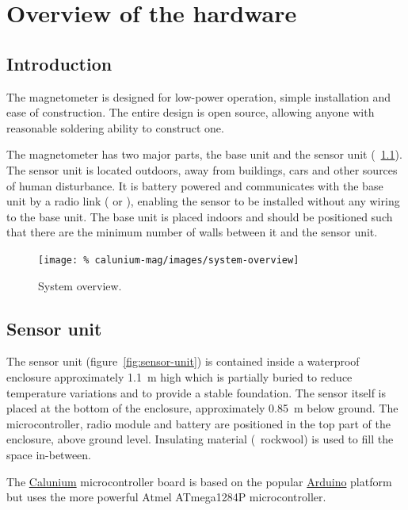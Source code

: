 \chapter{Overview of the hardware}

\section{Introduction}
The magnetometer is designed for low-power operation, simple
installation and ease of construction. The entire design is open
source, allowing anyone with reasonable soldering ability to construct
one.

The magnetometer has two major parts, the base unit and the sensor
unit (\figurename~\ref{fig:system-overview}). The sensor unit is located
outdoors, away from buildings, cars and other sources of human
disturbance. It is battery powered and communicates with the base unit
by a radio link ( or ), enabling the sensor to be
installed without any wiring to the base unit. The base unit is placed
indoors and should be positioned such that there are the minimum
number of walls between it and the sensor unit.

\begin{figure}
  \centering
  \texttt{[image: \%
    calunium-mag/images/system-overview]}
  \caption[System overview]%
  {System overview.}
  \label{fig:system-overview}
\end{figure}

\section{Sensor unit}

The sensor unit (figure~\ref{fig:sensor-unit}) is contained inside a
waterproof enclosure approximately \SI{1.1}{\metre} high which is
partially buried to reduce temperature variations and to provide a
stable foundation. The sensor itself is placed at the bottom of the
enclosure, approximately \SI{0.85}{\metre} below ground. The
microcontroller, radio module and battery are positioned in the top
part of the enclosure, above ground level. Insulating material (\eg\
rockwool) is used to fill the space in-between.

The
\href{http://blog.stevemarple.co.uk/search/label/Calunium}{Calunium}
microcontroller board is based on the popular
\href{http://arduino.cc}{Arduino} platform but uses the more powerful
Atmel ATmega1284P microcontroller.

